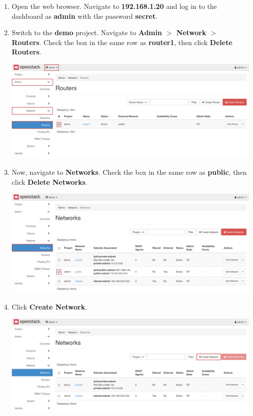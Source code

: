 \documentclass[letterpaper, 12pt]{article}
\begin{document}
\begin{enumerate}
    \item Open the web browser. Navigate to \textbf{192.168.1.20} and log in to the dashboard as \textbf{admin}
    with the password \textbf{secret}.

    \item Switch to the \textbf{demo} project. Navigate to \textbf{Admin $>$ Network $>$ Routers}. Check the box in the
    same row as \textbf{router1}, then click \textbf{Delete Routers}.

    \begin{center}
        \includegraphics[width=\linewidth]{images/part1/step2.png}
    \end{center}

    \item Now, navigate to \textbf{Networks}. Check the box in the same row as \textbf{public}, then click
    \textbf{Delete Networks}.

    \begin{center}
        \includegraphics[width=\linewidth]{images/part1/step3.png}
    \end{center}

    \item Click \textbf{Create Network}.
    
    \begin{center}
        \includegraphics[width=\linewidth]{images/part1/step4.png}
    \end{center}
    

\end{enumerate}
\end{document}
